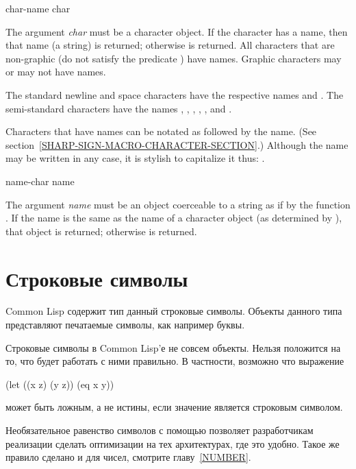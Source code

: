 \begin{defun}[Function]
char-name char

The argument \emph{char} must be a character object.
If the character has a name, then that name (a string) is returned;
otherwise {\false} is returned.  All characters that are non-graphic
(do not satisfy the predicate ) have names.
Graphic characters may or may not have names.

The standard newline and space characters have the respective
names  and .
The semi-standard characters have the names
, , , , , and .

Characters that have names can be notated as \cd{\#{\Xbackslash}} followed
by the name.  (See section~\ref{SHARP-SIGN-MACRO-CHARACTER-SECTION}.)
Although the name may be written in any case,
it is stylish to capitalize it thus: .
\end{defun}

\begin{defun}[Function]
name-char name

The argument \emph{name} must be an object coerceable to a string
as if by the function .
If the name is the same as the name of a character object
(as determined by ), that object
is returned; otherwise {\false} is returned.
\end{defun}

\else %

\chapter{Строковые символы}

Common Lisp содержит тип данный строковые символы. Объекты данного типа
представляют печатаемые символы, как например буквы. 

Строковые символы в Common Lisp'е не совсем объекты. Нельзя положится на то, что
 будет работать с ними правильно. В частности, возможно что выражение
\begin{lisp}
(let ((x z) (y z)) (eq x y))
\end{lisp}
может быть ложным, а не истины, если значение  является строковым
символом.

\beforenoterule
\begin{rationale}
Необязательное равенство символов с помощью  позволяет разработчикам реализации
сделать оптимизации на тех архитектурах, где это удобно. Такое же правило
сделано и для чисел, смотрите главу~\ref{NUMBER}.
\end{rationale}
\afternoterule

